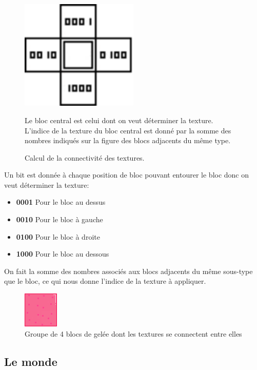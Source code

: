 \documentclass[10pt]{report}
\begin{document}
\begin{figure}[H]
  \centering
  \includegraphics[width=0.5\textwidth]{images/connected_textures_offset_computing}
  \caption{Calcul de la connectivité des textures.}
  Le bloc central est celui dont on veut déterminer la texture.\\
  L'indice de la texture du bloc central est donné par la somme des nombres indiqués sur la figure des blocs adjacents du même type.
  \label{fig:connected_textures_computing}
\end{figure}

Un bit est donnée à chaque position de bloc pouvant entourer le bloc donc on veut déterminer la texture:
\begin{itemize}
  \item \textbf{0001} Pour le bloc au dessus
  \item \textbf{0010} Pour le bloc à gauche
  \item \textbf{0100} Pour le bloc à droite
  \item \textbf{1000} Pour le bloc au dessous
\end{itemize}
On fait la somme des nombres associés aux blocs adjacents du même sous-type que le bloc, ce qui nous donne l'indice de la texture à appliquer.

\begin{figure}[H]
  \centering
  \includegraphics[height=0.2\textwidth]{images/connectedTiles}
  \caption{Groupe de 4 blocs de gelée dont les textures se connectent entre elles}
  \label{fig:connected_tiles}
\end{figure}

\subsection{Le monde}
\end{document}
